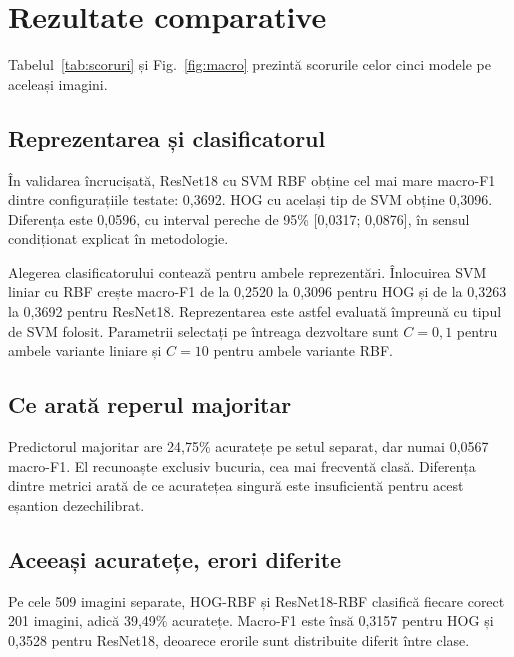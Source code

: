 \documentclass[conference]{IEEEtran}
\begin{document}
\section{Rezultate comparative}
Tabelul~\ref{tab:scoruri} și Fig.~\ref{fig:macro} prezintă scorurile celor cinci modele pe aceleași imagini.

\begin{table}[!t]
\caption{Scoruri pe aceleași imagini pentru toate modelele: 2069 în validarea încrucișată și 509 în evaluarea separată}
\label{tab:scoruri}
\centering
\resizebox{\columnwidth}{!}{}
\end{table}


\subsection{Reprezentarea și clasificatorul}
În validarea încrucișată, ResNet18 cu SVM RBF obține cel mai mare macro-F1 dintre configurațiile testate: 0,3692. HOG cu același tip de SVM obține 0,3096. Diferența este 0,0596, cu interval pereche de 95\% [0,0317; 0,0876], în sensul condiționat explicat în metodologie.

Alegerea clasificatorului contează pentru ambele reprezentări. Înlocuirea SVM liniar cu RBF crește macro-F1 de la 0,2520 la 0,3096 pentru HOG și de la 0,3263 la 0,3692 pentru ResNet18. Reprezentarea este astfel evaluată împreună cu tipul de SVM folosit. Parametrii selectați pe întreaga dezvoltare sunt $C=0,1$ pentru ambele variante liniare și $C=10$ pentru ambele variante RBF.

\subsection{Ce arată reperul majoritar}
Predictorul majoritar are 24,75\% acuratețe pe setul separat, dar numai 0,0567 macro-F1. El recunoaște exclusiv bucuria, cea mai frecventă clasă. Diferența dintre metrici arată de ce acuratețea singură este insuficientă pentru acest eșantion dezechilibrat.

\subsection{Aceeași acuratețe, erori diferite}
Pe cele 509 imagini separate, HOG-RBF și ResNet18-RBF clasifică fiecare corect 201 imagini, adică 39,49\% acuratețe. Macro-F1 este însă 0,3157 pentru HOG și 0,3528 pentru ResNet18, deoarece erorile sunt distribuite diferit între clase.
\end{document}
